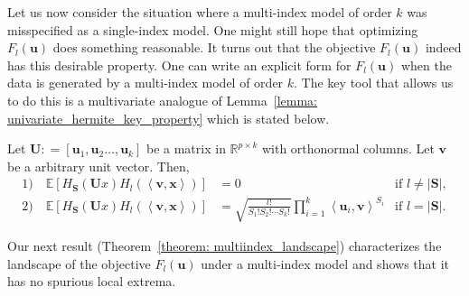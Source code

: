 \documentclass[final,12pt]{colt2018} %
\newcommand{\E}{\mathbb{E}}
\newcommand{\R}{\mathbb{R}}
\renewcommand\v[1]{{\ensuremath{\boldsymbol{#1}}}}
\newcommand\ip[1]{\left\langle #1 \right\rangle}
\begin{document}
Let us now consider the situation where a multi-index model of order $k$ was misspecified as a single-index model. One might still hope that optimizing $F_l(\v u)$ does something reasonable. It turns out that the objective $F_l(\v u)$ indeed has this desirable property. One can write an explicit form for  $F_l(\v u)$ when the data is generated by a multi-index model of order $k$. The key tool that allows us to do this is a multivariate analogue of Lemma~\ref{lemma: univariate_hermite_key_property} which is stated below.  
\begin{lemma}
\label{lemma: multivariate_hermite_lemma}
 Let $\v U : = [\v u_1, \v u_2 \dotsc, \v u_k]$ be a matrix in $\R^{p \times k}$ with orthonormal columns. Let $\v v$ be a arbitrary unit vector. Then, 
 \begin{align*}
     1) \quad \E \left[H_{\v S}(\v U x) H_l(\ip{\v v, \v x}) \right] &= 0 &\text{if $l \neq |\v S|$}, \\
     2) \quad \E \left[H_{\v S}(\v U x) H_l(\ip{\v v, \v x}) \right] &= \sqrt{\frac{l!}{S_1 ! S_2 ! \dotsb S_k !}} \prod_{i=1}^k \ip{\v u_i, \v v}^{S_i} &\text{if $l = |\v S|$}.
\end{align*}
\end{lemma}
Our next result (Theorem~\ref{theorem: multiindex_landscape}) characterizes the landscape of the objective $F_l(\v u)$ under a multi-index model and shows that it has no spurious local extrema. 
\end{document}

